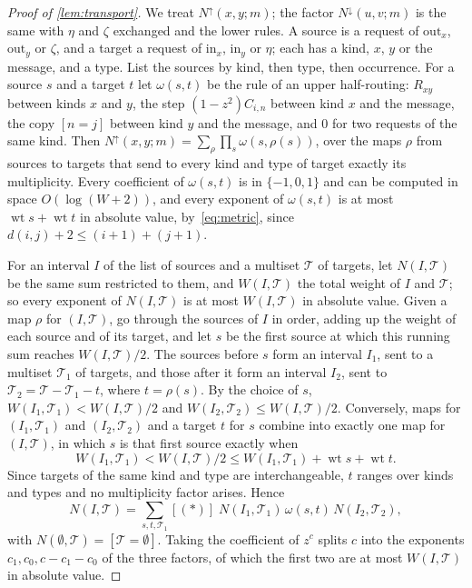 \documentclass[11pt]{article}
\theoremstyle{definition}
\theoremstyle{definition}
\theoremstyle{remark}
\newcommand{\wt}{\operatorname{wt}}
\newcommand{\out}{\mathrm{out}}
\newcommand{\inn}{\mathrm{in}}
\newcommand{\Nup}{N^{\uparrow}}
\newcommand{\Ndown}{N^{\downarrow}}
\begin{document}
\begin{proof}[Proof of \cref{lem:transport}]
We treat $\Nup(x,y;m)$; the factor $\Ndown(u,v;m)$ is the same with $\eta$ and $\zeta$ exchanged and the lower rules. A source is a request of $\out_x$, $\out_y$ or $\zeta$, and a target a request of $\inn_x$, $\inn_y$ or $\eta$; each has a kind, $x$, $y$ or the message, and a type. List the sources by kind, then type, then occurrence. For a source $s$ and a target $t$ let $\omega(s,t)$ be the rule of an upper half-routing: $R_{xy}$ between kinds $x$ and $y$, the step $(1-z^2)C_{i,n}$ between kind $x$ and the message, the copy $[n=j]$ between kind $y$ and the message, and $0$ for two requests of the same kind. Then $\Nup(x,y;m)=\sum_\rho\prod_s\omega(s,\rho(s))$, over the maps $\rho$ from sources to targets that send to every kind and type of target exactly its multiplicity. Every coefficient of $\omega(s,t)$ is in $\{-1,0,1\}$ and can be computed in space $O(\log(W+2))$, and every exponent of $\omega(s,t)$ is at most $\wt s+\wt t$ in absolute value, by~\eqref{eq:metric}, since $d(i,j)+2\le(i+1)+(j+1)$.

For an interval $I$ of the list of sources and a multiset $\mathcal T$ of targets, let $N(I,\mathcal T)$ be the same sum restricted to them, and $W(I,\mathcal T)$ the total weight of $I$ and $\mathcal T$; so every exponent of $N(I,\mathcal T)$ is at most $W(I,\mathcal T)$ in absolute value. Given a map $\rho$ for $(I,\mathcal T)$, go through the sources of $I$ in order, adding up the weight of each source and of its target, and let $s$ be the first source at which this running sum reaches $W(I,\mathcal T)/2$. The sources before $s$ form an interval $I_1$, sent to a multiset $\mathcal T_1$ of targets, and those after it form an interval $I_2$, sent to $\mathcal T_2=\mathcal T-\mathcal T_1-t$, where $t=\rho(s)$. By the choice of $s$, $W(I_1,\mathcal T_1)<W(I,\mathcal T)/2$ and $W(I_2,\mathcal T_2)\le W(I,\mathcal T)/2$. Conversely, maps for $(I_1,\mathcal T_1)$ and $(I_2,\mathcal T_2)$ and a target $t$ for $s$ combine into exactly one map for $(I,\mathcal T)$, in which $s$ is that first source exactly when
\[
W(I_1,\mathcal T_1)<W(I,\mathcal T)/2\le W(I_1,\mathcal T_1)+\wt s+\wt t.\tag{$*$}
\]
Since targets of the same kind and type are interchangeable, $t$ ranges over kinds and types and no multiplicity factor arises. Hence
\[
N(I,\mathcal T)=\sum_{s,t,\mathcal T_1}[(*)]\;N(I_1,\mathcal T_1)\,\omega(s,t)\,N(I_2,\mathcal T_2),
\]
with $N(\emptyset,\mathcal T)=[\mathcal T=\emptyset]$. Taking the coefficient of $z^c$ splits $c$ into the exponents $c_1,c_0,c-c_1-c_0$ of the three factors, of which the first two are at most $W(I,\mathcal T)$ in absolute value.


\end{proof}
\end{document}
